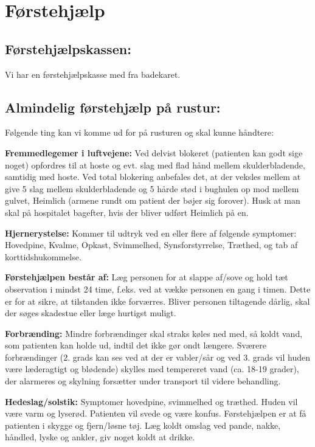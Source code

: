 \section{Førstehjælp}
\subsection{Førstehjælpskassen:}
Vi har en førstehjælpskasse med fra badekaret.


\subsection{Almindelig førstehjælp på rustur:}
Følgende ting kan vi komme ud for på rusturen og skal kunne håndtere:


\textbf{Fremmedlegemer i luftvejene:} Ved delvist blokeret (patienten kan godt sige noget) opfordres til at hoste og evt. slag med flad hånd mellem skulderbladende, samtidig med hoste. Ved total blokering anbefales det, at der veksles mellem at give 5 slag mellem skulderbladende og 5 hårde stød i bughulen op mod mellem gulvet, Heimlich (armene rundt om patient der bøjer sig forover). Husk at man skal på hospitalet bagefter, hvis der bliver udført Heimlich på en.


\textbf{Hjernerystelse:} Kommer til udtryk ved en eller flere af følgende symptomer: Hovedpine, Kvalme, Opkast, Svimmelhed, Synsforstyrrelse, Træthed, og tab af korttidshukommelse.


\textbf{Førstehjælpen består af:} Læg personen for at slappe af/sove og hold tæt observation i mindst 24 time, f.eks. ved at vække personen en gang i timen. Dette er for at sikre, at tilstanden ikke forværres. Bliver personen tiltagende dårlig, skal der søges skadestue eller læge hurtigst muligt.


\textbf{Forbrænding:} Mindre forbrændinger skal straks køles ned med, så koldt vand, som patienten kan holde ud, indtil det ikke gør ondt længere. Sværere forbrændinger (2. grads kan ses ved at der er vabler/sår og ved 3. grads vil huden være læderagtigt og blødende) skylles med tempereret vand (ca. 18-19 grader), der alarmeres og skylning forsætter under transport til videre behandling. 


\textbf{Hedeslag/solstik:} Symptomer hovedpine, svimmelhed og træthed. Huden vil være varm og lyserød. Patienten vil svede og være konfus. Førstehjælpen er at få patienten i skygge og fjern/løsne tøj. Læg koldt omslag ved pande, nakke, håndled, lyske og ankler, giv noget koldt at drikke. 


